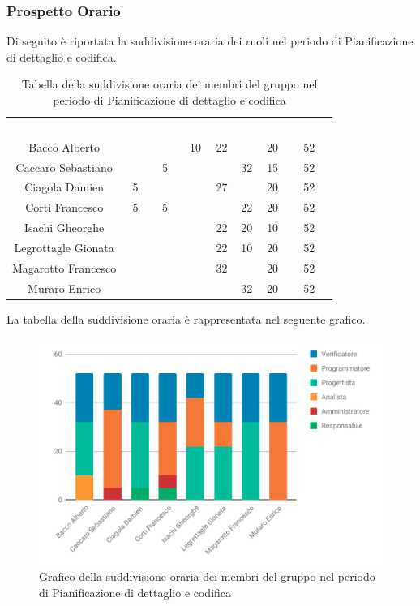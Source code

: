 \subsubsection{Prospetto Orario}
Di seguito è riportata la suddivisione oraria dei ruoli nel periodo di Pianificazione di dettaglio e codifica.




\begin{table}[H]	
	\begin{center}
	    \begin{tabular}{cccccccc}
			\rowcolor{greySWEight}
			\textcolor{white}{\textbf{Nome}} & \textcolor{white}{\textbf{Re}} & \textcolor{white}{\textbf{Am}} & \textcolor{white}{\textbf{An}} & \textcolor{white}{\textbf{Pj}} & \textcolor{white}{\textbf{Pr}} & \textcolor{white}{\textbf{Ve}} & \textcolor{white}{\textbf{Totale}}
			\\ 
			Bacco Alberto & & & 10 & 22 & & 20 & 52 \\
			Caccaro Sebastiano & & 5 & & & 32 & 15 & 52 \\
			Ciagola Damien & 5 & & & 27 & & 20 & 52 \\
			Corti Francesco & 5 & 5 & & & 22 & 20 & 52 \\
			Isachi Gheorghe & & & & 22 & 20 & 10 & 52 \\
			Legrottagle Gionata & & & & 22 & 10 & 20 & 52 \\
			Magarotto Francesco & & & & 32 & & 20 & 52 \\
			Muraro Enrico & & & & & 32 & 20 & 52 \\
			\end{tabular}
	    \caption{Tabella della suddivisione oraria dei membri del gruppo nel periodo di Pianificazione di dettaglio e codifica} \label{tab:tabellaPersonePianificazione di dettaglio e codifica} 
	\end{center}
\end{table}

La tabella della suddivisione oraria è rappresentata nel seguente grafico.
\begin{figure}[H]
	\includegraphics[width=1\linewidth]{Preventivo/grafici/PC1.pdf}
	\caption{Grafico della suddivisione oraria dei membri del gruppo nel periodo di Pianificazione di dettaglio e codifica}
\end{figure}

